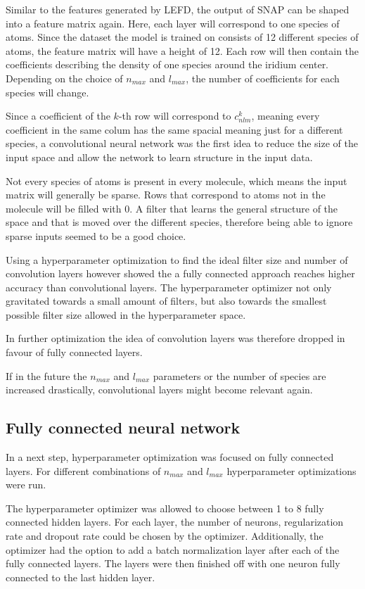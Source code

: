 Similar to the features generated by LEFD, the output of SNAP can be shaped into a feature matrix again.
Here, each layer will correspond to one species of atoms.
Since the dataset the model is trained on consists of 12 different species of atoms, the feature matrix will have a height of 12.
Each row will then contain the coefficients describing the density of one species around the iridium center.
Depending on the choice of $n_{max}$ and $l_{max}$, the number of coefficients for each species will change.

Since a coefficient of the $k$-th row will correspond to $c^k_{nlm}$, meaning every coefficient in the same colum has the same spacial meaning just for a different species,
a convolutional neural network was the first idea to reduce the size of the input space and allow the network to learn structure in the input data.

Not every species of atoms is present in every molecule, which means the input matrix will generally be sparse.
Rows that correspond to atoms not in the molecule will be filled with 0.
A filter that learns the general structure of the space and that is moved over the different species, therefore 
being able to ignore sparse inputs seemed to be a good choice.

Using a hyperparameter optimization to find the ideal filter size and number of convolution layers however showed
the a fully connected approach reaches higher accuracy than convolutional layers.
The hyperparameter optimizer not only gravitated towards a small amount of filters, but also towards 
the smallest possible filter size allowed in the hyperparameter space.

In further optimization the idea of convolution layers was therefore dropped in favour of fully connected layers.

If in the future the $n_{max}$ and $l_{max}$ parameters or the number of species are increased drastically, 
convolutional layers might become relevant again.

\subsection{Fully connected neural network}

In a next step, hyperparameter optimization was focused on fully connected layers.
For different combinations of $n_{max}$ and $l_{max}$ hyperparameter optimizations were run.

The hyperparameter optimizer was allowed to choose between 1 to 8 fully connected hidden layers.
For each layer, the number of neurons, regularization rate and dropout rate could be chosen by the optimizer.
Additionally, the optimizer had the option to add a batch normalization layer after each of the fully connected layers.
The layers were then finished off with one neuron fully connected to the last hidden layer.

